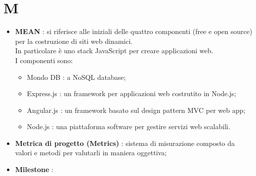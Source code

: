 % 
%
%
%
%

\section{M}

\begin{itemize}
	\item \textbf{MEAN} : si riferisce alle iniziali delle quattro componenti (free e open source) per la costruzione di siti web dinamici. \\
In particolare è uno stack JavaScript per creare applicazioni web. \\
I componenti sono:
	\begin{itemize}
		\item Mondo DB : a NoSQL database;
		\item Express.js : un framework per applicazioni web costrutito in Node.js;
		\item Angular.js : un framework basato sul design pattern MVC per web app;
		\item Node.js : una piattaforma software per gestire servizi web scalabili.
	\end{itemize}

	\item \textbf{Metrica di progetto (Metrics)} : sistema di misurazione composto da valori e metodi per valutarli in maniera oggettiva; 
	
	\item \textbf{Milestone} : 


\end{itemize}
